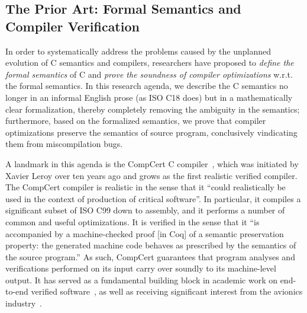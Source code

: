 

\subsection{The Prior Art: Formal Semantics and Compiler Verification}

In order to systematically address the problems caused by the unplanned evolution of C semantics and
compilers, researchers have proposed to \emph{define the formal semantics} of C and \emph{prove the
  soundness of compiler optimizations} w.r.t. the formal semantics.  In this research agenda, we
describe the C semantics no longer in an informal English prose (as ISO C18 does) but in a
mathematically clear formalization, thereby completely removing the ambiguity in the semantics;
furthermore, based on the formalized semantics, we prove that compiler optimizations preserve the
semantics of source program, conclusively vindicating them from miscompilation bugs.

A landmark in this agenda is the CompCert C compiler~\cite{compcert}, which was initiated by Xavier
Leroy over ten years ago and grows as the first realistic verified compiler.  The CompCert compiler
is realistic in the sense that it ``could realistically be used in the context of production of
critical software''.  In particular, it compiles a significant subset of ISO C99 down to assembly,
and it performs a number of common and useful optimizations.  It is verified in the sense that it
``is accompanied by a machine-checked proof [in Coq] of a semantic preservation property: the
generated machine code behaves as prescribed by the semantics of the source program.''  As such,
CompCert guarantees that program analyses and verifications performed on its input carry over
soundly to its machine-level output.  It has served as a fundamental building block in academic work
on end-to-end verified software~\cite{TODO}, as well as receiving significant interest from the
avionics industry~\cite{TODO}. 

